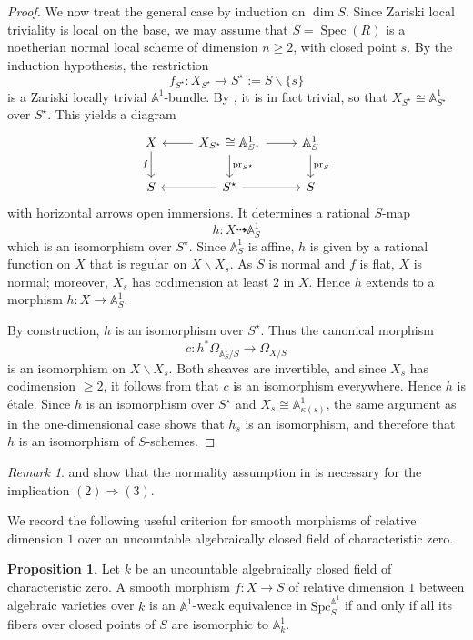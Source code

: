 \documentclass[10pt]{amsart}
\renewcommand{\AA}{\mathbb{A}}
\newcommand{\Spec}{\operatorname{Spec}}
\renewcommand{\setminus}{\smallsetminus}
\numberwithin{equation}{section} %
\theoremstyle{plain}
\theoremstyle{definition}
\newtheorem{prop}[prop]{Proposition}
\theoremstyle{remark}
\newtheorem{remark}[remark]{Remark}
\begin{document}
\begin{proof}
We now treat the general case by induction on $\dim S$. Since Zariski local triviality is local on the base, we may assume that $S=\Spec(R)$ is a noetherian normal local scheme of dimension $n\geq 2$, with closed point $s$. By the induction hypothesis, the restriction
\[
f_{S^\star}:X_{S^\star}\to S^\star:=S\setminus\{s\}
\]
is a Zariski locally trivial $\AA^1$-bundle. By \cite[\S2.2--2.3]{KW85}, it is in fact trivial, so that $X_{S^\star}\cong \AA^1_{S^\star}$ over $S^\star$. This yields a diagram
\[
\begin{tikzcd}
X \arrow[d,swap,"f"] & X_{S^\star}\cong \AA^1_{S^\star} \arrow[l] \arrow[r] \arrow[d,"\mathrm{pr}_{S^\star}"] & \AA^1_S \arrow[d,"\mathrm{pr}_S"] \\
S & S^\star \arrow[l] \arrow[r] & S
\end{tikzcd}
\]
with horizontal arrows open immersions. It determines a rational $S$-map
\[
h:X\dashrightarrow \AA^1_S
\]
which is an isomorphism over $S^\star$. Since $\AA^1_S$ is affine, $h$ is given by a rational function on $X$ that is regular on $X\setminus X_s$. As $S$ is normal and $f$ is flat, $X$ is normal; moreover, $X_s$ has codimension at least $2$ in $X$. Hence $h$ extends to a morphism $h:X\to \AA^1_S$.
\medskip

By construction, $h$ is an isomorphism over $S^\star$. Thus the canonical morphism
\[
c:h^*\Omega_{\AA^1_S/S}\longrightarrow \Omega_{X/S}
\]
is an isomorphism on $X\setminus X_s$. Both sheaves are invertible, and since $X_s$ has codimension $\geq 2$, it follows from \cite[Théorème~5.10.5]{EGAIV-Grothendieck1966} that $c$ is an isomorphism everywhere. Hence $h$ is \'etale. Since $h$ is an isomorphism over $S^\star$ and $X_s\cong \AA^1_{\kappa(s)}$, the same argument as in the one-dimensional case shows that $h_s$ is an isomorphism, and therefore that $h$ is an isomorphism of $S$-schemes.
\end{proof}



\begin{remark}\label{exa:cusp-base-non-loctrivial}
 and  show that the normality assumption in  is necessary for the implication $(2)\Rightarrow (3)$.
\end{remark}

We record the following useful criterion for smooth morphisms of relative dimension $1$ over an uncountable algebraically closed field of characteristic zero.

\begin{prop} \label{prop:close-fibers-A1}
Let $k$ be an uncountable algebraically closed field of characteristic zero. A smooth morphism $f:X\to S$ of relative dimension $1$ between algebraic varieties over $k$ is an $\AA^1$-weak equivalence in $\mathrm{Spc}_S^{\AA^1}$ if and only if all its fibers over closed points of $S$ are isomorphic to $\AA^1_k$.
\end{prop}
\end{document}
